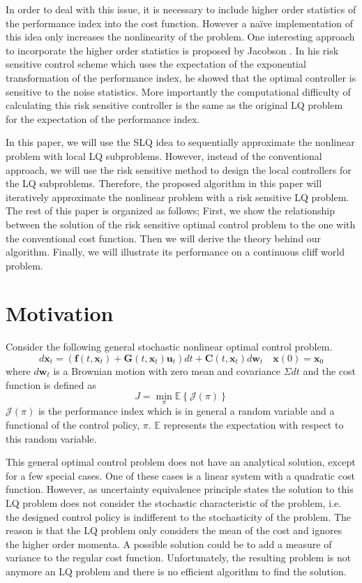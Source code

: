 \documentclass[letterpaper, 10 pt, conference]{ieeeconf}
\newcommand{\vf}{\mathbf f}
\newcommand{\vu}{\mathbf u}
\newcommand{\vw}{\mathbf w}
\newcommand{\vx}{\mathbf x}
\newcommand{\vC}{\mathbf C}
\newcommand{\vG}{\mathbf G}
\begin{document}
In order to deal with this issue, it is necessary to include higher order
statistics of the performance index into the cost function. However a na\"ive
implementation of this idea only increases the nonlinearity of the problem.
One interesting approach to incorporate the higher order statistics is proposed
by Jacobson \cite{jacobson73}. In his risk sensitive control scheme which uses the
expectation of the exponential transformation of the performance index, he showed
that the optimal controller is sensitive to the noise statistics. More
importantly the computational difficulty of calculating this risk sensitive
controller is the same as the original LQ problem for the expectation of the
performance index.

In this paper, we will use the SLQ idea to sequentially approximate the nonlinear
problem with local LQ subproblems. However, instead of the conventional approach,
we will use the risk sensitive method to design the local controllers for the LQ
subproblems. Therefore, the proposed algorithm in this paper will iteratively
approximate the nonlinear problem with a risk sensitive LQ problem. The rest of
this paper is organized as follows; First, we show the relationship between the
solution of the risk sensitive optimal control problem to the one with the
conventional cost function. Then we will derive the theory behind our algorithm.
Finally, we will illustrate its performance on a continuous cliff world problem.


\section{Motivation}
Consider the following general stochastic nonlinear optimal control problem.
\begin{equation} \label{eq:wiener_process}
d\vx_t = \left( \vf(t,\vx_t) + \vG(t,\vx_t)\vu_t \right)dt + \vC(t,\vx_t) d\vw_t \quad \vx(0)=\vx_0
\end{equation}
where $d\vw_t$ is a Brownian motion with zero mean and covariance $\Sigma dt$ and
the cost function is defined as
\begin{equation} \label{eq:general_cost_funtion}
J = \min_{\pi} \mathbb{E} \left\{ \mathcal{J(\pi)} \right\}
\end{equation}
$\mathcal{J(\pi)}$ is the performance index which is in general a random variable
and a functional of the control policy, $\pi$. $\mathbb{E}$ represents the
expectation with respect to this random variable.

This general optimal control problem does not have an analytical
solution, except for a few special cases. One of these cases is a linear system
with a quadratic cost function. However, as uncertainty equivalence principle
states the solution to this LQ problem does not consider the
stochastic characteristic of the problem, i.e. the designed control policy is
indifferent to the stochasticity of the problem. The reason is that the LQ
problem only considers the mean of the cost and ignores the higher order
momenta. A possible solution could be to add a measure of variance to the
regular cost function. Unfortunately, the resulting problem is not anymore an LQ
problem and there is no efficient algorithm to find the solution.
\end{document}
